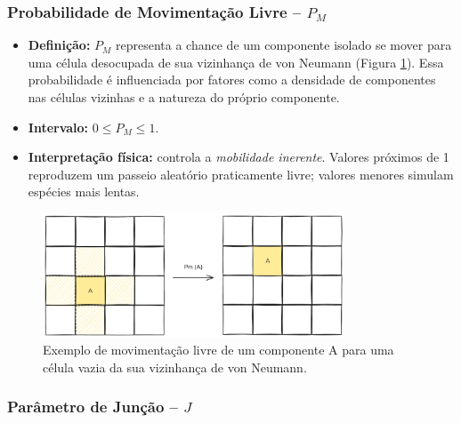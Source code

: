 \documentclass[12pt,oneside]{report}
\begin{document}
\subsubsection{Probabilidade de Movimentação Livre – \texorpdfstring{$P_M$}{Pm}}
\label{subsubsec:Pm}

\begin{itemize}
    \item \textbf{Definição:} $P_M$ representa a chance de um componente isolado se mover para uma célula desocupada de sua vizinhança de von Neumann (Figura \ref{fig:movimentacao_livre}). Essa probabilidade é influenciada por fatores como a densidade de componentes nas células vizinhas e a natureza do próprio componente.
    \item \textbf{Intervalo:} $0 \le P_M \le 1$.
    \item \textbf{Interpretação física:} controla a \textit{mobilidade inerente}.
          Valores próximos de 1 reproduzem um passeio aleatório praticamente livre; valores
          menores simulam espécies mais lentas.
\end{itemize}

\begin{figure}[H]
    \centering
    \includegraphics[width=0.8\textwidth]{Pm.png}
    \caption{\small Exemplo de movimentação livre de um componente A para uma célula vazia da sua vizinhança de von Neumann.}
    \label{fig:movimentacao_livre}
\end{figure}

\subsubsection{Parâmetro de Junção – \texorpdfstring{$J$}{J}}
\label{subsubsec:J}
\end{document}
